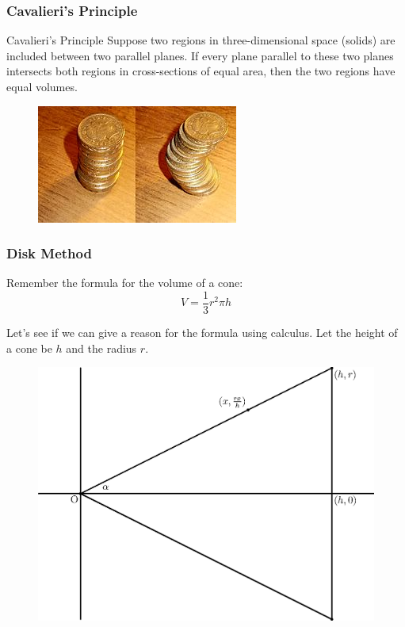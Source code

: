 \documentclass[xcolor=dvipsnames]{beamer}
\begin{document}
\begin{frame}
  \frametitle{Cavalieri's Principle}
  \begin{block}{Cavalieri's Principle}
    Suppose two regions in three-dimensional space (solids) are
    included between two parallel planes. If every plane parallel to
    these two planes intersects both regions in cross-sections of
    equal area, then the two regions have equal volumes.
  \end{block}
  \begin{figure}[h]
    \includegraphics[scale=2]{./diagrams/cavalieri.jpg}
  \end{figure}
\end{frame}


\begin{frame}
  \frametitle{Disk Method}
Remember the formula for the volume of a cone:
\begin{equation}
  \label{eq:veishiir}
   V=\frac{1}{3}r^{2}\pi{}h 
\end{equation}

Let's see if we can give a reason for the formula using calculus. Let
the height of a cone be $h$ and the radius $r$.

\begin{figure}[h]
  \includegraphics[scale=0.4]{./diagrams/conevol.eps}
\end{figure}
\end{frame}
\end{document}
